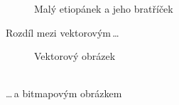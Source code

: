 \documentclass[a4paper,11pt]{article}
\begin{document}
\begin{figure}[ht]
\begin{center}
{				
			}
			\caption{Malý etiopánek a jeho bratříček}
			\label{obrazok1}
		\end{center}
	\end{figure}
	
	
	\newpage
	Rozdíl mezi vektorovým\,\dots
	\begin{figure}[ht]
		\begin{center}
			\caption{Vektorový obrázek}
			\label{obrazok2}
		\end{center}
	\end{figure}\\
	\dots\,a bitmapovým obrázkem
	
\end{document}
